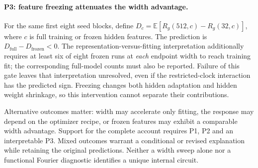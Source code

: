 \paragraph{P3: feature freezing attenuates the width advantage.}
For the same first eight seed blocks, define $D_c=\mathbb{E}[R_g(512,c)-R_g(32,c)]$, where $c$ is full training or frozen hidden features. The prediction is $D_{\mathrm{full}}-D_{\mathrm{frozen}}<0$. The representation-versus-fitting interpretation additionally requires at least six of eight frozen runs at \emph{each} endpoint width to reach training fit; the corresponding full-model counts must also be reported. Failure of this gate leaves that interpretation unresolved, even if the restricted-clock interaction has the predicted sign. Freezing changes both hidden adaptation and hidden weight shrinkage, so this intervention cannot separate their contributions.

Alternative outcomes matter: width may accelerate only fitting, the response may depend on the optimizer recipe, or frozen features may exhibit a comparable width advantage. Support for the complete account requires P1, P2 and an interpretable P3. Mixed outcomes warrant a conditional or revised explanation while retaining the original predictions. Neither a width sweep alone nor a functional Fourier diagnostic identifies a unique internal circuit.
